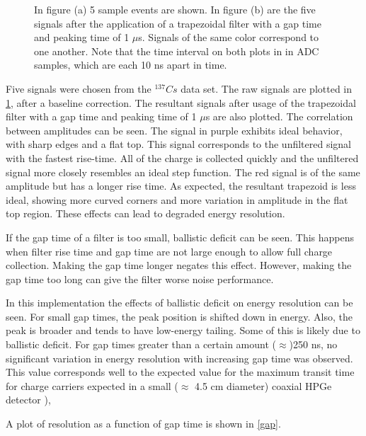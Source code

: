 \begin{figure}%
    \centering
    \quad
    \caption{In figure (a) 5 sample events are shown. In figure (b) are the five signals after the application of a trapezoidal filter with a gap time and peaking time of 1 $\mu$s. Signals of the same color correspond to one another. Note that the time interval on both plots in in ADC samples, which are each 10 ns apart in time.}%
    \label{fig:signals}%
\end{figure}

Five signals were chosen from the ${}^{137}{Cs}$ data set. The raw signals are plotted in \ref{fig:signals}, after a baseline correction. The resultant signals after usage of the trapezoidal filter with a gap time and peaking time of 1 $\mu$s are also plotted. The correlation between amplitudes can be seen. The signal in purple exhibits ideal behavior, with sharp edges and a flat top. This signal corresponds to the unfiltered signal with the fastest rise-time. All of the charge is collected quickly and the unfiltered signal more closely resembles an ideal step function. The red signal is of the same amplitude but has a longer rise time. As expected, the resultant trapezoid is less ideal, showing more curved corners and more variation in amplitude in the flat top region. These effects can lead to degraded energy resolution.

If the gap time of a filter is too small, ballistic deficit can be seen. This happens when filter rise time and gap time are not large enough to allow full charge collection. Making the gap time longer negates this effect. However, making the gap time too long can give the filter worse noise performance. 

In this implementation the effects of ballistic deficit on energy resolution can be seen. For small gap times, the peak position is shifted down in energy. Also, the peak is broader and tends to have low-energy tailing. Some of this is likely due to ballistic deficit. For gap times greater than a certain amount ($\approx$)250 ns, no significant variation in energy resolution with increasing gap time was observed. This value corresponds well to the expected value for the maximum transit time for charge carriers expected in a small ($\approx$ 4.5 cm diameter) coaxial HPGe detector \cite{Knoll} ),

A plot of resolution as a function of gap time is shown in \ref{gap}.

